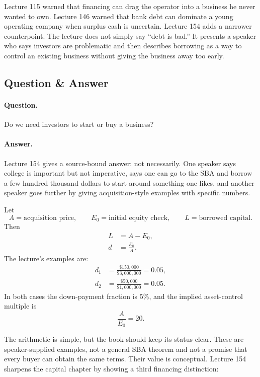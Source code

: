 \documentclass[11pt,oneside]{book}
\begin{document}
Lecture 115 warned that financing can drag the operator into a business he never wanted to own. Lecture 146 warned that bank debt can dominate a young operating company when surplus cash is uncertain. Lecture 154 adds a narrower counterpoint. The lecture does not simply say ``debt is bad.'' It presents a speaker who says investors are problematic and then describes borrowing as a way to control an existing business without giving the business away too early.

\subsection{Question \& Answer}

\paragraph{Question.}
Do we need investors to start or buy a business?

\paragraph{Answer.}
Lecture 154 gives a source-bound answer: not necessarily. One speaker says college is important but not imperative, says one can go to the SBA and borrow a few hundred thousand dollars to start around something one likes, and another speaker goes further by giving acquisition-style examples with specific numbers.

Let
\[
A=\text{acquisition price},
\qquad
E_0=\text{initial equity check},
\qquad
L=\text{borrowed capital}.
\]
Then
\begin{align}
L &= A-E_0,\\
d &= \frac{E_0}{A}.
\end{align}
The lecture's examples are:
\begin{align}
d_1 &= \frac{\$150{,}000}{\$3{,}000{,}000}=0.05,\\
d_2 &= \frac{\$50{,}000}{\$1{,}000{,}000}=0.05.
\end{align}
In both cases the down-payment fraction is \(5\%\), and the implied asset-control multiple is
\begin{equation}
\frac{A}{E_0}=20.
\end{equation}

The arithmetic is simple, but the book should keep its status clear. These are speaker-supplied examples, not a general SBA theorem and not a promise that every buyer can obtain the same terms. Their value is conceptual. Lecture 154 sharpens the capital chapter by showing a third financing distinction:
\end{document}
